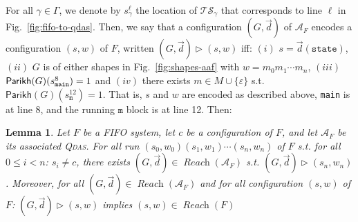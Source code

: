 \documentclass[runningheads,oribibl,]{article}
\newcommand{\Aa}{\ensuremath{\mathcal{A}}\xspace}
\newcommand{\Ts}{\ensuremath{\mathcal{TS}}\xspace}
\newcommand{\e}{\ensuremath{\varepsilon}\xspace}
\newcommand{\qdas}{\textsc{Qdas}\xspace}
\DeclareMathOperator{\Reach}{\textit{Reach}}
\newcommand{\Graph}{\ensuremath{G}}
\newcommand{\Data}{\ensuremath{\vec{d}}}
\newcommand{\Parikh}{\ensuremath{\mathsf{Parikh}}}
\newcommand{\mystate}[2]{\ensuremath{s^{#1}_{\mathtt{#2}}}}
\newtheorem{lemma}{Lemma}{}
\begin{document}
For all $\gamma\in\Gamma$, we denote by $\mystate{\ell}{\gamma}$ the
location of $\Ts_\gamma$ that corresponds to line $\ell$ in
Fig.~\ref{fig:fifo-to-qdas}. Then, we say that a configuration
$(\Graph,\Data)$ of $\Aa_F$ encodes a configuration $(s,w)$ of $F$,
written $(\Graph,\Data)\rhd(s,w)$ iff: $(i)$
$s=\Data(\mathtt{state})$, $(ii)$ $\Graph$ is of either shapes in
Fig.~\ref{fig:shapes-aaf} with $w=m_0m_1\cdots m_n$, $(iii)$
$\Parikh(G)(\mystate{8}{{\tt main}})=1$ and $(iv)$ there exists $m\in
M\cup\{\e\}$ s.t. $\Parikh(G)(\mystate{12}{m})=1$. That is, $s$ and
$w$ are encoded as described above, \texttt{main} is at line 8, and
the running $\mathtt{m}$ block is at line 12. Then:

\begin{lemma}\label{lem:from-fifo-to-qdas}
  Let $F$ be a FIFO system, let $c$ be a configuration of $F$, and let
  $\Aa_F$ be its associated \qdas. For all run
  $(s_0,w_0)(s_1,w_1)\cdots(s_n,w_n)$ of $F$ s.t. for all $0\leq i<n$:
  $s_i\neq c$, there exists $(G,\Data)\in\Reach(\Aa_F)$ s.t.
  $(G,\Data)\rhd(s_n,w_n)$. Moreover, for all
  $(G,\Data)\in\Reach(\Aa_F)$ and for all configuration $(s,w)$ of
  $F$: $(G,\Data)\rhd(s,w)$ implies $(s,w)\in\Reach(F)$
\end{lemma}
\end{document}
